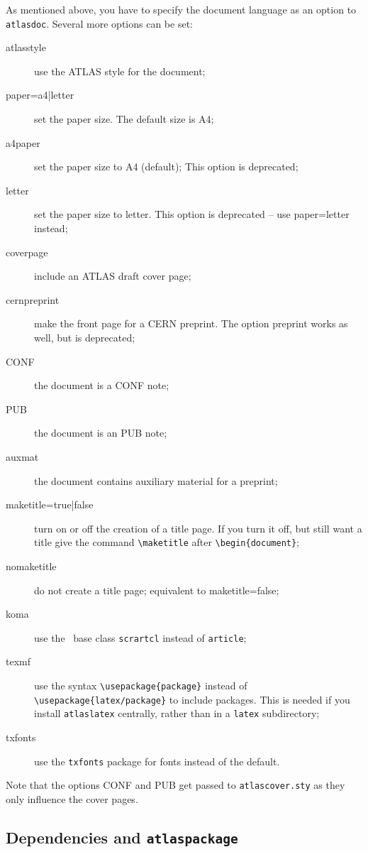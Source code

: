 \documentclass[atlasstyle,UKenglish]{latex/atlasdoc}
\newcommand{\File}[1]{\texttt{#1}\xspace}
\newcommand{\Macro}[1]{\texttt{\textbackslash #1}\xspace}
\newcommand{\Option}[1]{\textsf{#1}\xspace}
\newcommand{\Package}[1]{\texttt{#1}\xspace}
\begin{document}
As mentioned above, you have to specify the document language as an option to \Package{atlasdoc}.
Several more options can be set:
\begin{description}
\item[atlasstyle] use the ATLAS style for the document;
\item[paper=a4|letter] set the paper size. The default size is A4;
\item[a4paper] set the paper size to A4 (default);
  This option is deprecated;
\item[letter] set the paper size to letter.
  This option is deprecated -- use \Option{paper=letter} instead;
\item[coverpage] include an ATLAS draft cover page;
\item[cernpreprint] make the front page for a CERN preprint.
  The option \Option{preprint} works as well, but is deprecated;
\item[CONF] the document is a CONF note;
\item[PUB] the document is an PUB note;
\item[auxmat] the document contains auxiliary material for a preprint;
\item[maketitle=true|false] turn on or off the creation of a title page. If you turn it off,
  but still want a title give the command \Macro{maketitle} after
  \verb|\begin{document}|;
\item[nomaketitle] do not create a title page; equivalent to \Option{maketitle=false};
\item[koma] use the \KOMAScript\ base class \Package{scrartcl} instead of \Package{article};
\item[texmf] use the syntax \Macro{usepackage\{package\}}
  instead of \Macro{usepackage\{latex/package\}} to include packages.
  This is needed if you install \Package{atlaslatex} centrally,
  rather than in a \File{latex} subdirectory;
\item[txfonts] use the \Package{txfonts} package for fonts instead of the default.
\end{description}
Note that the options \Option{CONF} and \Option{PUB} get passed to \Package{atlascover.sty}
as they only influence the cover pages.


\subsection{Dependencies and \Package{atlaspackage}}
\label{sec:atlaspackage}
\end{document}
